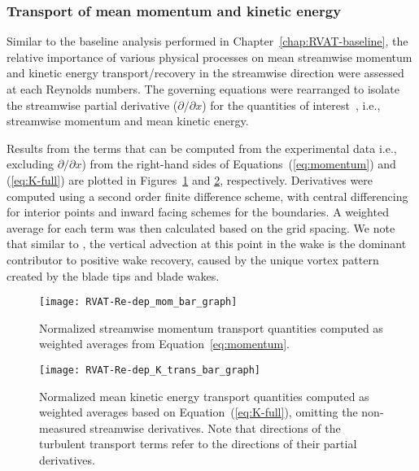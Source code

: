 \subsubsection{Transport of mean momentum and kinetic energy}

Similar to the baseline analysis performed in Chapter~\ref{chap:RVAT-baseline},
the relative importance of various physical processes on mean streamwise
momentum and kinetic energy transport/recovery in the streamwise direction were
assessed at each Reynolds numbers. The governing equations were rearranged to
isolate the streamwise partial derivative ($\partial / \partial x$) for the
quantities of interest~\cite{Bachant2015-JoT}, i.e., streamwise momentum and
mean kinetic energy.

Results from the terms that can be computed from the experimental data i.e.,
excluding $\partial / \partial x$) from the right-hand sides of
Equations~(\ref{eq:momentum}) and (\ref{eq:K-full}) are plotted in
Figures~\ref{fig:mom-bar-graph} and \ref{fig:K-bar-graph}, respectively.
Derivatives were computed using a second order finite difference scheme, with
central differencing for interior points and inward facing schemes for the
boundaries. A weighted average for each term was then calculated based on the
grid spacing. We note that similar to \cite{Bachant2015-JoT}, the vertical
advection at this point in the wake is the dominant contributor to positive wake
recovery, caused by the unique vortex pattern created by the blade tips and
blade wakes.

\begin{figure}
    \centering
    
    \texttt{[image: RVAT-Re-dep\_mom\_bar\_graph]}
    
    \caption{Normalized streamwise momentum transport quantities computed as
        weighted averages from Equation~\ref{eq:momentum}.}
    
    \label{fig:mom-bar-graph}
\end{figure}

\begin{figure}
    \centering
    
    \texttt{[image: RVAT-Re-dep\_K\_trans\_bar\_graph]}
    
    \caption{Normalized mean kinetic energy transport quantities computed as
        weighted averages based on Equation~(\ref{eq:K-full}), omitting the
        non-measured streamwise derivatives. Note that directions of the turbulent
        transport terms refer to the directions of their partial derivatives.}
    
    \label{fig:K-bar-graph}
\end{figure}

